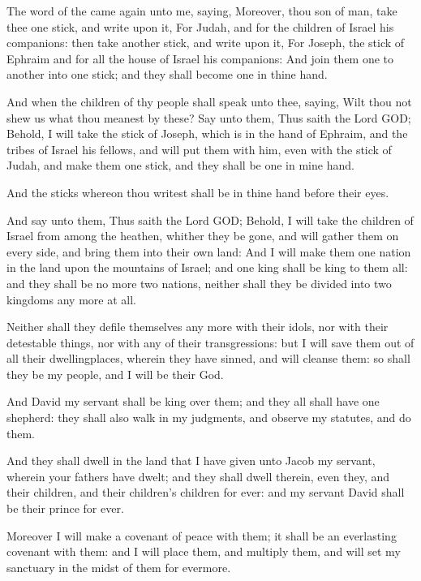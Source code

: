 \Verse The word of the \LORD came again unto me, saying, \Verse Moreover, thou son of man, take thee one stick, and write upon it, For Judah, and for the children of Israel his companions: then take another stick, and write upon it, For Joseph, the stick of Ephraim and for all the house of Israel his companions: \Verse And join them one to another into one stick; and they shall become one in thine hand.

\Verse And when the children of thy people shall speak unto thee, saying, Wilt thou not shew us what thou meanest by these?  \Verse Say unto them, Thus saith the Lord GOD; Behold, I will take the stick of Joseph, which is in the hand of Ephraim, and the tribes of Israel his fellows, and will put them with him, even with the stick of Judah, and make them one stick, and they shall be one in mine hand.

\Verse And the sticks whereon thou writest shall be in thine hand before their eyes.

\Verse And say unto them, Thus saith the Lord GOD; Behold, I will take the children of Israel from among the heathen, whither they be gone, and will gather them on every side, and bring them into their own land: \Verse And I will make them one nation in the land upon the mountains of Israel; and one king shall be king to them all: and they shall be no more two nations, neither shall they be divided into two kingdoms any more at all.

\Verse Neither shall they defile themselves any more with their idols, nor with their detestable things, nor with any of their transgressions: but I will save them out of all their dwellingplaces, wherein they have sinned, and will cleanse them: so shall they be my people, and I will be their God.

\Verse And David my servant shall be king over them; and they all shall have one shepherd: they shall also walk in my judgments, and observe my statutes, and do them.

\Verse And they shall dwell in the land that I have given unto Jacob my servant, wherein your fathers have dwelt; and they shall dwell therein, even they, and their children, and their children's children for ever: and my servant David shall be their prince for ever.

\Verse Moreover I will make a covenant of peace with them; it shall be an everlasting covenant with them: and I will place them, and multiply them, and will set my sanctuary in the midst of them for evermore.


